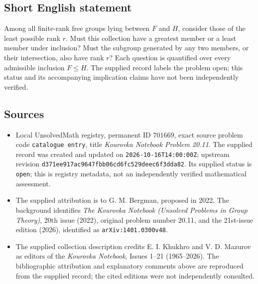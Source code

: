 \documentclass[11pt]{article}
\begin{document}
\subsection{Short English statement}
Among all finite-rank free groups lying between \(F\) and \(H\), consider those of the least possible rank \(r\). Must this collection have a greatest member or a least member under inclusion? Must the subgroup generated by any two members, or their intersection, also have rank \(r\)? Each question is quantified over every admissible inclusion \(F\leq H\). The supplied record labels the problem open; this status and its accompanying implication claims have not been independently verified.
\subsection{Sources}
\begin{itemize}
\item Local UnsolvedMath registry, permanent ID \(701669\), exact source problem code \texttt{catalogue entry}, title \emph{Kourovka Notebook Problem 20.11}. The supplied record was created and updated on \texttt{2026-10-16T14:00:00Z}; upstream revision \texttt{d371ee917ac9647fbb06cd6fc529deec6f3dda82}. Its supplied status is \texttt{open}; this is registry metadata, not an independently verified mathematical assessment.
\item The supplied attribution is to G. M. Bergman, proposed in 2022. The background identifies \emph{The Kourovka Notebook (Unsolved Problems in Group Theory)}, 20th issue (2022), original problem number 20.11, and the 21st-issue edition (2026), identified as \texttt{arXiv:1401.0300v48}.
\item The supplied collection description credits E. I. Khukhro and V. D. Mazurov as editors of the \emph{Kourovka Notebook}, Issues 1--21 (1965--2026). The bibliographic attribution and explanatory comments above are reproduced from the supplied record; the cited editions were not independently consulted.
\end{itemize}
\end{document}
